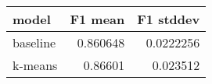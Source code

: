 \begin{tabular}{lrr}
\toprule
 model    &   F1 mean &   F1 stddev \\
\midrule
 baseline &  0.860648 &   0.0222256 \\
 k-means  &  0.86601  &   0.023512  \\
\bottomrule
\end{tabular}